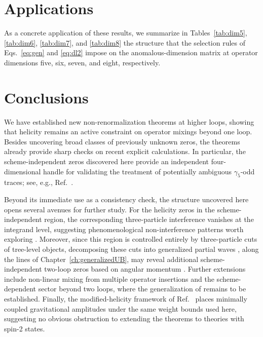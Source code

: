 \section{Applications\label{sec:2loopapplications}}

As a concrete application of these results, we summarize in Tables~\ref{tab:dim5}, \ref{tab:dim6},
\ref{tab:dim7}, and \ref{tab:dim8} the structure that the selection rules of
Eqs.~\eqref{eq:gen} and \eqref{eq:dl2} impose on the anomalous-dimension matrix at operator
dimensions five, six, seven, and eight, respectively.






\section{Conclusions\label{sec:2loopconclusions}}

We have established new non-renormalization theorems at higher loops, showing that helicity remains an active constraint on operator mixings beyond one loop. Besides uncovering broad classes of previously unknown zeros, the theorems already provide sharp checks on recent explicit calculations.
In particular, the scheme-independent zeros discovered here provide an independent four-dimensional handle for validating the treatment of potentially ambiguous $\gamma_5$-odd traces; see, e.g., Ref.~\cite{Born:2026xkr}.

Beyond its immediate use as a consistency check, the structure uncovered here opens several avenues for further study.
For the helicity zeros in the scheme-independent region, the corresponding three-particle interference vanishes at the integrand level, suggesting phenomenological non-interference patterns worth exploring \cite{Azatov:2016sqh}.
Moreover, since this region is controlled entirely by three-particle cuts of tree-level objects,
decomposing these cuts into generalized partial waves \cite{Jiang:2020rwz,Shu:2021qlr}, along the
lines of Chapter~\ref{ch:generalizedUB}, may reveal additional scheme-independent two-loop zeros
based on angular momentum \cite{Jiang:2020rwz}.
Further extensions include non-linear mixing from multiple operator insertions and the
scheme-dependent sector beyond two loops, where the generalization of  remains to be
established.
Finally, the modified-helicity framework of Ref.~\cite{Baratella:2021guc} places minimally coupled gravitational amplitudes under the same weight bounds used here,
suggesting no obvious obstruction to extending the theorems to theories with spin-2 states.

